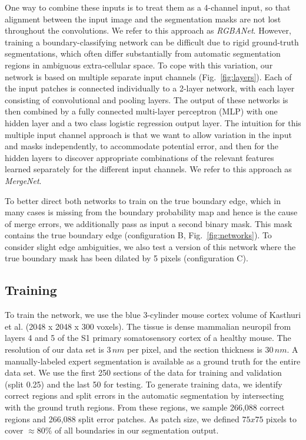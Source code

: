 One way to combine these inputs is to treat them as a 4-channel input, so that alignment between the input image and the segmentation masks are not lost throughout the convolutions. We refer to this approach as \textit{RGBANet}. However, training a boundary-classifying network can be difficult due to rigid ground-truth segmentations, which often differ substantially from automatic segmentation regions in ambiguous extra-cellular space. To cope with this variation, our network is based on multiple separate input channels (Fig.~\ref{fig:layers}). Each of the input patches is connected individually to a 2-layer network, with each layer consisting of convolutional and pooling layers. The output of these networks is then combined by a fully connected multi-layer perceptron (MLP) with one hidden layer and a two class logistic regression output layer. The intuition for this multiple input channel approach is that we want to allow variation in the input and masks independently, to accommodate potential error, and then for the hidden layers to discover appropriate combinations of the relevant features learned separately for the different input channels. We refer to this approach as \textit{MergeNet}.

To better direct both networks to train on the true boundary edge, which in many cases is missing from the boundary probability map and hence is the cause of merge errors, we additionally pass as input a second binary mask. This mask contains the true boundary edge (configuration B, Fig.~\ref{fig:networks}). To consider slight edge ambiguities, we also test a version of this network where the true boundary mask has been dilated by 5 pixels (configuration C).



\subsection{Training}
To train the network, we use the blue 3-cylinder mouse cortex volume of Kasthuri et al. \cite{kasthuri2015saturated} (2048 x 2048 x 300 voxels). The tissue is dense mammalian neuropil from layers 4 and 5 of the S1 primary somatosensory cortex of a healthy mouse. The resolution of our data set is $3\, nm$ per pixel, and the section thickness is $30\, nm$. 
A manually-labeled expert segmentation is available as a ground truth for the entire data set. We use the first 250 sections of the data for training and validation (split 0.25) and the last 50 for testing. To generate training data, we identify correct regions and split errors in the automatic segmentation by intersecting with the ground truth regions. From these regions, we sample 266,088 correct regions and 266,088 split error patches. As patch size, we defined $75 x 75$ pixels to cover $\approx80\%$ of all boundaries in our segmentation output. 
%



